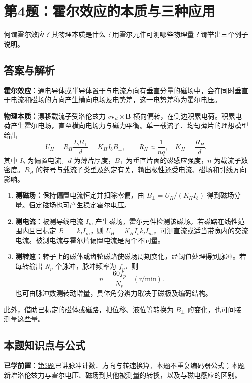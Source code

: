 \section{第4题：霍尔效应的本质与三种应用}
\label{hw:4-4}
\begin{hwquestion}
何谓霍尔效应？其物理本质是什么？用霍尔元件可测哪些物理量？请举出三个例子说明。
\end{hwquestion}

\subsection*{答案与解析}
\textbf{霍尔效应：}通电导体或半导体置于与电流方向有垂直分量的磁场中，会在同时垂直于电流和磁场的方向产生横向电场及电势差，这一电势差称为霍尔电压。

\textbf{物理本质：}漂移载流子受洛伦兹力 $q\mathbf v_d\times\mathbf B$ 横向偏转，在侧边积累电荷。积累电荷产生霍尔电场，直至横向电场力与磁力平衡。单一载流子、均匀薄片的理想模型给出
\[
U_H=R_H\frac{I_bB_\perp}{d}=K_HI_bB_\perp,
\qquad R_H\approx\frac{1}{nq},\quad K_H=\frac{R_H}{d}.
\]
其中 $I_b$ 为偏置电流，$d$ 为薄片厚度，$B_\perp$ 为垂直片面的磁感应强度，$n$ 为载流子数密度。$R_H$ 的符号与载流子类型及约定有关，输出极性还受电流、磁场和引线方向影响。

\begin{enumerate}
\item \textbf{测磁场：}保持偏置电流恒定并扣除零偏，由 $B_\perp=U_H/(K_HI_b)$ 得到磁场分量。恒定磁场也可产生稳定霍尔电压。
\item \textbf{测电流：}被测导线电流 $I_m$ 产生磁场，霍尔元件检测该磁场。若磁路在线性范围内且已标定 $B_\perp=k_I I_m$，则 $U_H=K_HI_bk_I I_m$，可测直流或适当带宽内的交流电流。被测电流与霍尔片偏置电流是两个不同量。
\item \textbf{测转速：}转子上的磁体或齿轮磁路使磁场周期变化，经阈值处理得到脉冲。若每转输出 $N_p$ 个脉冲，脉冲频率为 $f_p$，则
\[
\boxed{n=\frac{60f_p}{N_p}\quad(\mathrm{r/min})}.
\]
也可由脉冲数测转动增量，具体角分辨力取决于磁极及编码结构。
\end{enumerate}
此外，借助已标定的磁体或磁路，把位移、液位等转换为 $B_\perp$ 的变化，也可间接测量这些量。

\subsection*{本题知识点与公式}\label{kn:4-4}
\noindent\textbf{已学前置：}\hyperref[kn:4-3]{第3题}已讲脉冲计数、方向与转速换算，本题不重复编码器公式；本题新增洛伦兹力与霍尔电压、磁场到其他被测量的转换，以及与磁电感应的区别。


